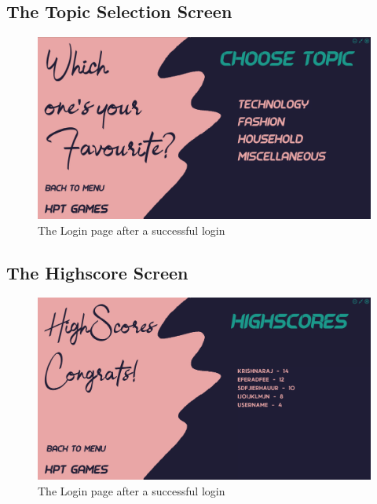 \documentclass[11pt]{article}
\begin{document}
\subsection{The Topic Selection Screen}
\begin{figure}[H]
	\centering
	\includegraphics[scale=0.30]{./design/Screenshots/Topic Selection.png}
	\caption{The Login page after a successful login}
\end{figure}
\subsection{The Highscore Screen}
\begin{figure}[H]
	\centering
	\includegraphics[scale=0.30]{./design/Screenshots/Highscores.png}
	\caption{The Login page after a successful login}
\end{figure}
\end{document}
